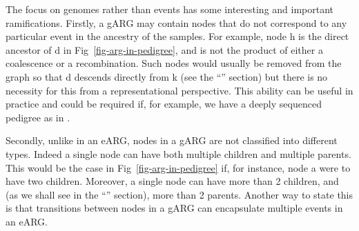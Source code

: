 \documentclass{article}
\begin{document}
The focus on genomes rather than events has some interesting
and important ramifications. Firstly, a gARG may contain nodes that
do not correspond to any particular event in the ancestry of the samples.
For example, node \textsf{h} is the direct ancestor of \textsf{d} in
Fig~\ref{fig-arg-in-pedigree}, and is not the product of either a
coalescence or a recombination. Such nodes would usually be removed
from the graph so that \textsf{d} descends directly from \textsf{k} (see
the ``'' section) but there is no necessity for this from
a representational perspective. This ability can be useful in practice and could be
required if, for example, we have a deeply sequenced pedigree as in \cite{RosFreixedes2022}.

Secondly, unlike in an eARG, nodes in a gARG are not classified into different
types. Indeed a single node can have both multiple children
and multiple parents. This would be the case in Fig~\ref{fig-arg-in-pedigree} if,
for instance, node \textsf{a} were to have two children.
Moreover, a single node can have more than 2 children, and (as we shall see in
the ``'' section), more than 2 parents. Another way to
state this is that transitions between nodes in a gARG can encapsulate multiple
events in an eARG.
\end{document}
